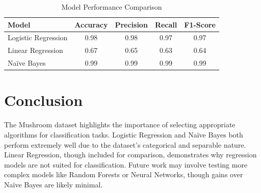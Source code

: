 \documentclass[conference]{IEEEtran}
\begin{document}
\begin{table}[h]
\centering
\caption{Model Performance Comparison}
\begin{tabular}{lcccc}
\toprule
Model & Accuracy & Precision & Recall & F1-Score \\
\midrule
Logistic Regression & 0.98 & 0.98 & 0.97 & 0.97 \\
Linear Regression & 0.67 & 0.65 & 0.63 & 0.64 \\
Naïve Bayes & 0.99 & 0.99 & 0.99 & 0.99 \\
\bottomrule
\end{tabular}
\end{table}

\section{Conclusion}
The Mushroom dataset highlights the importance of selecting appropriate algorithms for classification tasks. Logistic Regression and Naïve Bayes both perform extremely well due to the dataset’s categorical and separable nature. Linear Regression, though included for comparison, demonstrates why regression models are not suited for classification. Future work may involve testing more complex models like Random Forests or Neural Networks, though gains over Naïve Bayes are likely minimal.
\end{document}

